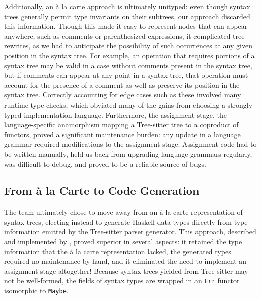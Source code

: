 \documentclass[acmsmall,fleqn,12pt]{acmart}
\begin{document}
Additionally, an à la carte approach is ultimately unityped: even though syntax
trees generally permit type invariants on their subtrees, our approach
discarded this information. Though this made it easy to represent nodes that
can appear anywhere, such as comments or parenthesized expressions, it
complicated tree rewrites, as we had to anticipate the possibility of such
occurrences at any given position in the syntax tree. For example, an operation
that requires portions of a syntax tree may be valid in a case without comments
present in the syntax tree, but if comments can appear at any point in a syntax
tree, that operation must account for the presence of a comment as well as
preserve its position in the syntax tree. Correctly accounting for edge cases
such as these involved many runtime type checks, which obviated many of the
gains from choosing a strongly typed implementation language. Furthermore, the
assignment stage, the language-specific anamorphism mapping a Tree-sitter tree
to a coproduct of functors, proved a significant maintenance burden: any update
in a language grammar required modifications to the assignment stage. Assignment
code had to be written manually, held us back from upgrading language grammars
regularly, was difficult to debug, and proved to be a reliable source of bugs.

\subsection{From à la Carte to Code Generation} \label{sec:codegen}

The team ultimately chose to move away from an à la carte representation of
syntax trees, electing instead to generate Haskell data types directly from type
information emitted by the Tree-sitter parser generator. This approach,
described and implemented by \citet{Nadeem20CodeGen}, proved superior in several
aspects: it retained the type information that the à la carte representation
lacked, the generated types required no maintenance by hand, and it eliminated
the need to implement an assignment stage altogether! Because syntax trees
yielded from Tree-sitter may not be well-formed, the fields of syntax types are
wrapped in an \texttt{Err} functor isomorphic to \texttt{Maybe}.
\end{document}
